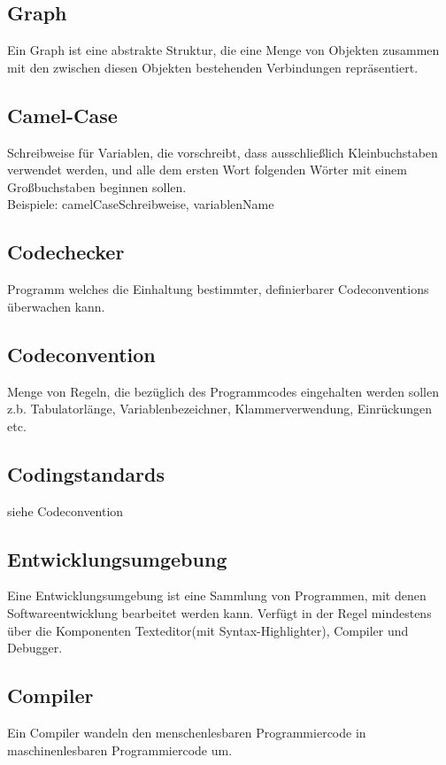 \documentclass[11pt,a4paper]{article}
\begin{document}
\subsection{Graph}
Ein Graph ist eine abstrakte Struktur, die eine Menge von Objekten zusammen mit den zwischen diesen Objekten bestehenden Verbindungen repräsentiert.

\subsection{Camel-Case}
Schreibweise für Variablen, die vorschreibt, dass ausschließlich Kleinbuchstaben verwendet werden, und alle dem ersten Wort folgenden Wörter mit einem Großbuchstaben beginnen sollen. \\
        Beispiele: camelCaseSchreibweise, variablenName

\subsection{Codechecker}
 Programm welches die Einhaltung bestimmter, definierbarer Codeconventions überwachen kann.

\subsection{Codeconvention}
Menge von Regeln, die bezüglich des Programmcodes eingehalten werden sollen z.b. Tabulatorlänge, Variablenbezeichner, Klammerverwendung, Einrückungen etc.

\subsection{Codingstandards}
siehe Codeconvention

\subsection{Entwicklungsumgebung}
Eine Entwicklungsumgebung ist eine Sammlung von Programmen, mit denen Softwareentwicklung bearbeitet werden kann. Verfügt in der Regel mindestens über die Komponenten Texteditor(mit Syntax-Highlighter), Compiler und Debugger.

\subsection{Compiler}
Ein Compiler wandeln  den menschenlesbaren Programmiercode in maschinenlesbaren Programmiercode um.
\end{document}
